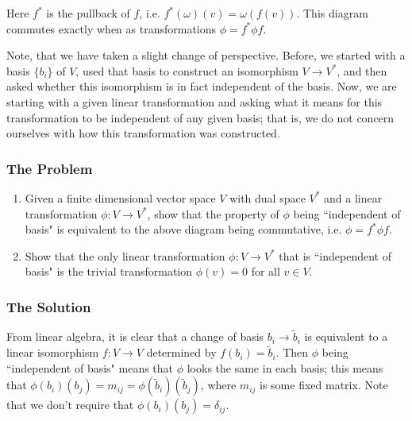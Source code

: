 \begin{figure}[h]
\centering
{}
\end{figure}
Here \(f^*\) is the pullback of \(f\), i.e. \(f^*(\omega)(v) = \omega(f(v))\). This diagram commutes exactly when as transformations \(\phi = f^* \phi f\).

Note, that we have taken a slight change of perspective. Before, we started with a basis \(\{b_i\}\) of \(V\), used that basis to construct an isomorphism \(V \to V^*\), and then asked whether
this isomorphism is in fact independent of the basis. Now, we are starting with a given linear transformation and asking what it means for this transformation to be independent of any given
basis; that is, we do not concern ourselves with how this transformation was constructed.

\subsubsection*{The Problem}

\begin{enumerate}
\item Given a finite dimensional vector space \(V\) with dual space \(V^*\) and a linear transformation \(\phi: V \to V^*\), show that the property of \(\phi\) being ``independent of basis"
is equivalent to the above diagram being commutative, i.e. \(\phi = f^* \phi f\).
\item Show that the only linear transformation \(\phi: V \to V^*\) that is ``independent of basis" is the trivial transformation \(\phi(v) = 0\) for all \(v \in V\).
\end{enumerate}

\subsubsection*{The Solution}

From linear algebra, it is clear that a change of basis \(b_i \to \tilde b_i\) is equivalent to a linear isomorphism \(f : V \to  V\) determined by \(f(b_i) = \tilde b_i\).
Then \(\phi\) being ``independent of basis" means that \(\phi\) looks the same in each basis; this means that \(\phi(b_i)(b_j) = m_{ij} = \phi(\tilde b_i)(\tilde b_j)\), where \(m_{ij}\)
is some fixed matrix. Note that we don't require that \(\phi(b_i)(b_j) = \delta_{ij}\).

